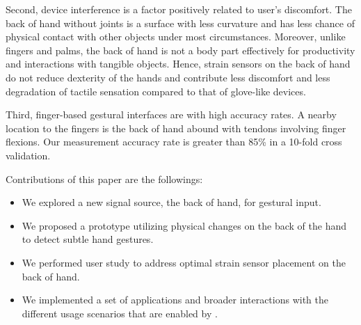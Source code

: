 \documentclass{sigchi}
\begin{document}
Second, device interference is a factor positively related to user's discomfort. The back of hand without joints is a surface with less curvature and has less chance of physical contact with other objects under most circumstances. Moreover, unlike fingers and palms, the back of hand is not a body part effectively for productivity and interactions with tangible objects. Hence, strain sensors on the back of hand do not reduce dexterity of the hands and contribute less discomfort and less degradation of tactile sensation compared to that of glove-like devices.

Third, finger-based gestural interfaces are with high accuracy rates. A nearby location to the fingers is the back of hand abound with tendons involving finger flexions. Our measurement accuracy rate is greater than 85\% in a 10-fold cross validation.

 




Contributions of this paper are the followings:
\begin{itemize}
\item We explored a new signal source, the back of hand, for gestural input.
\item We proposed a prototype utilizing physical changes on the back of the hand to detect subtle hand gestures. 
\item We performed user study to address optimal strain sensor placement on the back of hand.
\item We implemented a set of applications and broader interactions with the different usage scenarios that are enabled by \getTitleName.
\end{itemize}
\end{document}
